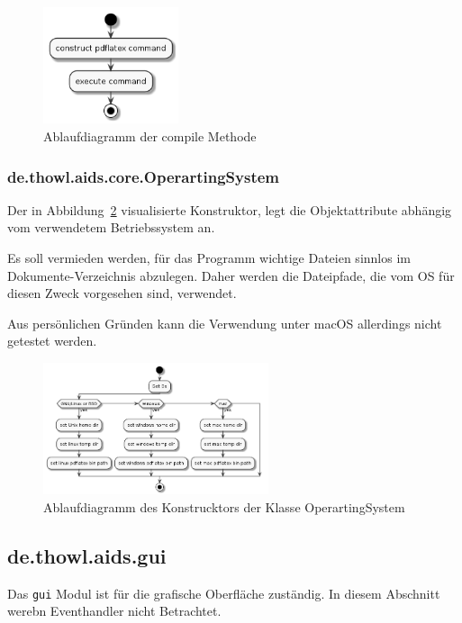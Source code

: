 \documentclass[stu, a4paper, 11pt, floatsintext]{apa7}
\begin{document}
\begin{figure}[!htbp]
\centering
\includegraphics[width=150px]{../technical_documentation/diagramm/uml/flowcharts/core/latex/compile.png}
\caption{\label{compile-methode}Ablaufdiagramm der compile Methode}
\end{figure}

\subsubsection{de.thowl.aids.core.OperartingSystem}
\noindent Der in Abbildung~\ref{os-construcktor} visualisierte Konstruktor, legt die Objektattribute abhängig vom verwendetem Betriebssystem an.

Es soll vermieden werden, für das Programm wichtige Dateien sinnlos im Dokumente-Verzeichnis abzulegen. Daher werden die Dateipfade, die vom OS für diesen Zweck vorgesehen sind, verwendet.

Aus persönlichen Gründen kann die Verwendung unter macOS allerdings nicht getestet werden.

\begin{figure}[!htbp]
\centering
\includegraphics[width=250px]{../technical_documentation/diagramm/uml/flowcharts/core/os/construcktor.png}
\caption{\label{os-construcktor}Ablaufdiagramm des Konstrucktors der Klasse OperartingSystem}
\end{figure}

\subsection{de.thowl.aids.gui}
\noindent Das \texttt{gui} Modul ist für die grafische Oberfläche zuständig.
In diesem Abschnitt werebn Eventhandler nicht Betrachtet.
\end{document}
